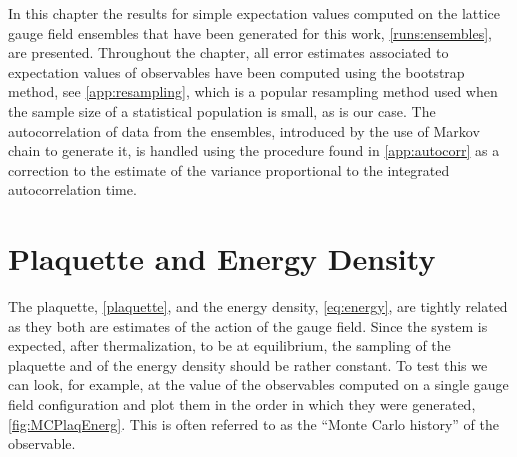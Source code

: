 In this chapter the results for simple expectation values computed on the lattice gauge field ensembles that have been generated for this work, \cref{runs:ensembles}, are presented. Throughout the chapter, all error estimates associated to expectation values of observables have been computed using the bootstrap method, see \cref{app:resampling}, which is a popular resampling method used when the sample size of a statistical population is small, as is our case. The autocorrelation of data from the ensembles, introduced by the use of Markov chain to generate it, is handled using the procedure found in \cref{app:autocorr} as a correction to the estimate of the variance proportional to the integrated autocorrelation time.

\section{Plaquette and Energy Density} 
The plaquette, \cref{plaquette}, and the energy density, \cref{eq:energy}, are tightly related as they both are estimates of the action of the gauge field.
Since the system is expected, after thermalization, to be at equilibrium, the sampling of the plaquette and of the energy density should be rather constant. To test this we can look, for example, at the value of the observables computed on a single gauge field configuration and plot them in the order in which they were generated, \ref{fig:MCPlaqEnerg}. This is often referred to as the ``Monte Carlo history'' of the observable.
